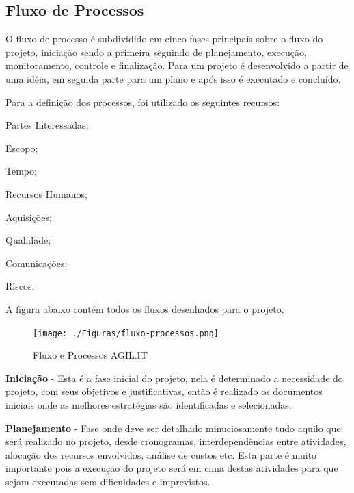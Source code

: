 \subsection{Fluxo de Processos}

{O fluxo de processo é subdividido em cinco fases principais sobre o fluxo do projeto, iniciação sendo a primeira seguindo de planejamento, execução, monitoramento, controle e finalização. Para \cite{PMG2018} um projeto é desenvolvido a partir de uma idéia, em seguida parte para um plano e após isso é executado e concluído.}

Para a definição dos processos, foi utilizado os seguintes recursos:

\begin{subalineas}
	\item {Partes Interessadas};
	\item {Escopo};
	\item {Tempo};
	\item {Recursos Humanos};
	\item {Aquisições};
	\item {Qualidade};
	\item {Comunicações};
	\item {Riscos}.
\end{subalineas}

A figura abaixo contém todos os fluxos desenhados para o projeto.

\begin{figure}[H]
	\caption{\label{Fluxo-Processos}Fluxo e Processos AGIL.IT}
	\begin{center}
		\texttt{[image: ./Figuras/fluxo-processos.png]}
	\end{center}
\end{figure}



{\textbf{Iniciação} - Esta é a fase inicial do projeto, nela é determinado a necessidade do projeto, com seus objetivos e justificativas, então é realizado os documentos iniciais onde as melhores estratégias são identificadas e selecionadas.}

{\textbf{Planejamento} - Fase onde deve ser detalhado minuciosamente tudo aquilo que será realizado no projeto, desde cronogramas, interdependências entre atividades, alocação dos recursos envolvidos, análise de custos etc. Esta parte é muito importante pois a execução do projeto será em cima destas atividades para que sejam executadas sem dificuldades e imprevistos.}

